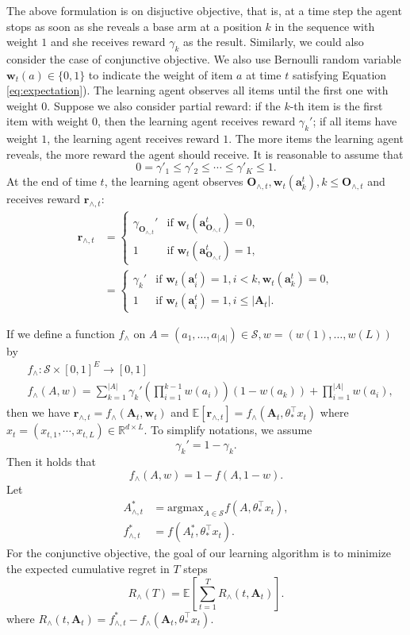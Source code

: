 \documentclass{article}
\newcommand{\EE}{\mathbb{E}}
\newcommand{\RR}{\mathbb{R}}
\newcommand{\bA}{\mathbf{A}}
\newcommand{\ba}{\mathbf{a}}
\newcommand{\bO}{\mathbf{O}}
\newcommand{\br}{\mathbf{r}}
\newcommand{\bw}{\mathbf{w}}
\newcommand{\cS}{\mathcal{S}}
\newcommand{\argmax}{\mathrm{argmax}}
\newcommand{\abs}[1]{\left| #1 \right|}
\begin{document}
The above formulation is on disjuctive objective, that is, at a time step the agent stops as soon as she reveals a base arm at a position $k$ in the sequence with weight $1$ and she receives reward $\gamma_k$ as the result. Similarly, we could also consider the case of conjunctive objective. We also use Bernoulli random variable $\bw_{t}(a) \in \{0,1\}$ to indicate the weight of item $a$ at time $t$ satisfying Equation \eqref{eq:expectation}). The learning agent observes all items until the first one with weight $0$. Suppose we also consider partial reward: if the $k$-th item is the first item with weight $0$, then the learning agent receives reward $\gamma_k'$; if all items have weight $1$, the learning agent receives reward $1$. The more items the learning agent reveals, the more reward the agent should receive. It is reasonable to assume that
$$
0 = \gamma'_1 \leq \gamma'_2 \leq \cdots \leq \gamma'_K \leq 1.
$$
At the end of time $t$, the learning agent observes $\bO_{\wedge, t}, \bw_t(\ba_k^t), k \leq \bO_{\wedge, t}$ and receives reward
	$\br_{\wedge, t}$:
\begin{align*}
\br_{\wedge, t} &= \begin{cases}
\gamma_{\bO_{\wedge, t}}'  &\text{if } \bw_t(\ba_{\bO_{\wedge, t}}^t) = 0,\\
1 &\text{if } \bw_t(\ba_{\bO_{\wedge, t}}^t) = 1,
\end{cases}\\
&=\begin{cases}
\gamma_{k}'  &\text{if } \bw_t(\ba_{i}^t) = 1, i < k, \bw_t(\ba_{k}^t) = 0,\\
1 &\text{if } \bw_t(\ba_{i}^t) = 1, i\leq \abs{\bA_t}.
\end{cases}
\end{align*}

If we define a function $f_{\wedge}$ on $A = (a_1, \ldots, a_{\abs{A}}) \in \cS, w = (w(1), \ldots, w(L))$ by
\begin{align*}
&f_{\wedge} : \cS \times [0,1]^E \to [0,1]\\
&f_{\wedge}(A,w) = \sum_{k = 1}^{\abs{A}} \gamma_k' (\prod_{i = 1}^{k - 1} w(a_i))(1 - w(a_k)) + \prod_{i=1}^{\abs{A}}w(a_i),
\end{align*}
then we have $\br_{\wedge, t} = f_{\wedge}(\bA_t, \bw_t)$ and $\EE[\br_{\wedge, t}] = f_{\wedge}(\bA_t, \theta_{\ast}^{\top}x_t)$ where $x_t = (x_{t,1}, \cdots, x_{t,L}) \in \RR^{d \times L}$. To simplify notations, we assume 
$$
\gamma_k' = 1 - \gamma_k.
$$
Then it holds that
\begin{equation}
\label{eq:ConDisRelation}
f_{\wedge}(A, w) = 1 - f(A, 1 - w).
\end{equation}
Let 
\begin{align*}
A_{\wedge, t}^{\ast} &= \argmax_{A\in \cS} f(A,\theta_{\ast}^{\top}x_t),\\
f_{\wedge, t}^{\ast} &= f(A_t^{\ast}, \theta_{\ast}^{\top}x_t).
\end{align*}
For the conjunctive objective, the goal of our learning algorithm is to minimize the expected cumulative regret in $T$ steps
$$
R_{\wedge}(T) = \EE[\sum_{t=1}^T R_{\wedge}(t, \bA_t)].
$$
where $R_{\wedge}(t, \bA_t) = f_{\wedge, t}^{\ast} - f_{\wedge}(\bA_t, \theta_{\ast}^{\top}x_t)$.
\end{document}
